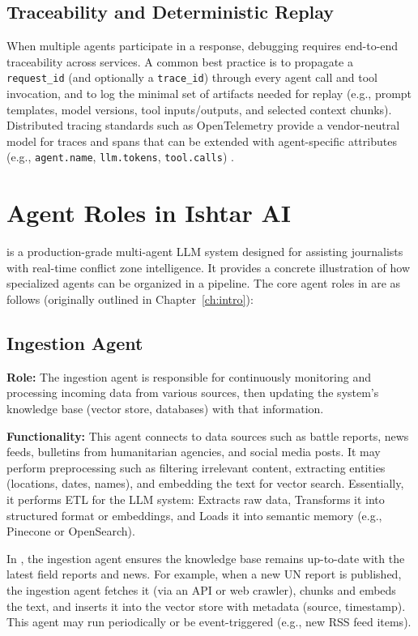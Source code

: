 \subsection{Traceability and Deterministic Replay}
When multiple agents participate in a response, debugging requires end-to-end traceability across services.
A common best practice is to propagate a \texttt{request\_id} (and optionally a \texttt{trace\_id}) through every agent call and tool invocation, and to log the minimal set of artifacts needed for replay (e.g., prompt templates, model versions, tool inputs/outputs, and selected context chunks).
Distributed tracing standards such as OpenTelemetry provide a vendor-neutral model for traces and spans that can be extended with agent-specific attributes (e.g., \texttt{agent.name}, \texttt{llm.tokens}, \texttt{tool.calls}) \cite{OpenTelemetryTraces}.

\section{Agent Roles in Ishtar AI}

\ishtar{} is a production-grade multi-agent LLM system designed for assisting journalists with real-time conflict zone intelligence. It provides a concrete illustration of how specialized agents can be organized in a pipeline. The core agent roles in \ishtar{} are as follows (originally outlined in Chapter~\ref{ch:intro}):  

\subsection{Ingestion Agent}
\textbf{Role:} The ingestion agent is responsible for continuously monitoring and processing incoming data from various sources, then updating the system’s knowledge base (vector store, databases) with that information.  

\textbf{Functionality:} This agent connects to data sources such as battle reports, news feeds, bulletins from humanitarian agencies, and social media posts. It may perform preprocessing such as filtering irrelevant content, extracting entities (locations, dates, names), and embedding the text for vector search. Essentially, it performs ETL for the LLM system: Extracts raw data, Transforms it into structured format or embeddings, and Loads it into semantic memory (e.g., Pinecone or OpenSearch).  

In \ishtar{}, the ingestion agent ensures the knowledge base remains up-to-date with the latest field reports and news. For example, when a new UN report is published, the ingestion agent fetches it (via an API or web crawler), chunks and embeds the text, and inserts it into the vector store with metadata (source, timestamp). This agent may run periodically or be event-triggered (e.g., new RSS feed items).  

